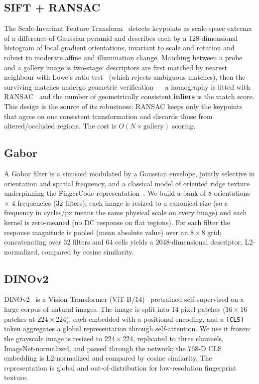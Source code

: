\documentclass[11pt,a4paper]{article}
\begin{document}
\subsection{SIFT + RANSAC}
The Scale-Invariant Feature Transform~\cite{lowe2004} detects keypoints as
scale-space extrema of a difference-of-Gaussian pyramid and describes each by a
$128$-dimensional histogram of local gradient orientations, invariant to scale and
rotation and robust to moderate affine and illumination change. Matching between a
probe and a gallery image is two-stage: descriptors are first matched by nearest
neighbour with Lowe's ratio test~\cite{lowe2004} (which rejects ambiguous
matches), then the surviving matches undergo geometric verification --- a
homography is fitted with RANSAC~\cite{fischler1981} and the number of
geometrically consistent \textbf{inliers} is the match score. This design is the
source of its robustness: RANSAC keeps only the keypoints that agree on one
consistent transformation and discards those from altered/occluded regions. The
cost is $O(N\times\text{gallery})$ scoring.

\subsection{Gabor}
A Gabor filter is a sinusoid modulated by a Gaussian envelope, jointly selective
in orientation and spatial frequency, and a classical model of oriented ridge
texture underpinning the FingerCode representation~\cite{jain2000}. We build a bank
of $8$ orientations $\times$ $4$ frequencies (\num{32} filters); each image is
resized to a canonical size (so a frequency in cycles/px means the same physical
scale on every image) and each kernel is zero-meaned (no DC response on flat
regions). For each filter the response magnitude is pooled (mean absolute value)
over an $8\times8$ grid; concatenating over $32$ filters and $64$ cells yields a
\num{2048}-dimensional descriptor, L2-normalized, compared by cosine similarity.

\subsection{DINOv2}
DINOv2~\cite{oquab2024} is a Vision Transformer (ViT-B/14)~\cite{dosovitskiy2021}
pretrained self-supervised on a large corpus of natural images. The image is split
into $14$-pixel patches ($16\times16$ patches at $224\times224$), each embedded
with a positional encoding, and a \texttt{[CLS]} token aggregates a global
representation through self-attention. We use it frozen: the grayscale image is
resized to $224\times224$, replicated to three channels, ImageNet-normalized, and
passed through the network; the $768$-D CLS embedding is L2-normalized and compared
by cosine similarity. The representation is global and out-of-distribution for
low-resolution fingerprint texture.
\end{document}
